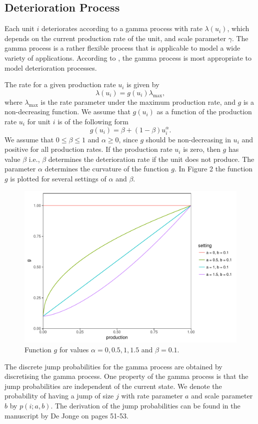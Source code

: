 \documentclass[a4paper,12pt]{article}
\begin{document}
\subsection{Deterioration Process}
Each unit $i$ deteriorates according to a gamma process with rate $\lambda(u_i)$, which depends on the current production rate of the unit, and scale parameter $\gamma$. The gamma process is a rather flexible process that is applicable to model a wide variety of applications. According to \cite{van2009survey}, the gamma process is most appropriate to model deterioration processes. 

The rate for a given production rate $u_i$ is given by
$$
\lambda(u_i) = g(u_i) \lambda_{\text{max}},
$$
where $\lambda_{\text{max}}$ is the rate parameter under the maximum production rate, and $g$ is a non-decreasing function. We assume that $g(u_i)$ as a function of the production rate $u_i$ for unit $i$ is of the following form
$$
g(u_i) = \beta + (1-\beta)u_i^\alpha.
$$
We assume that $0 \leq \beta \leq 1$ and $\alpha \geq 0$, since $g$ should be non-decreasing in $u_i$ and positive for all production rates. If the production rate $u_i$ is zero, then $g$ has value $\beta$ i.e., $\beta$ determines the deterioration rate if the unit does not produce.  The parameter $\alpha$ determines the curvature of the function $g$. In Figure 2 the function $g$ is plotted for several settings of $\alpha$ and $\beta$. 

\begin{figure}[H]
	\centering
	\includegraphics[width=0.5\linewidth]{figures/g}
	\caption{Function $g$ for values $\alpha = 0, 0.5, 1, 1.5$ and $\beta = 0.1$.}
\end{figure}

The discrete jump probabilities for the gamma process are obtained by discretising the gamma process. One property of the gamma process is that the jump probabilities are independent of the current state. We denote the probability of having a jump of size $j$ with rate parameter $a$ and scale parameter $b$ by $p(i; a, b)$. The derivation of the jump probabilities can be found in the manuscript by De Jonge on pages 51-53.
\end{document}
